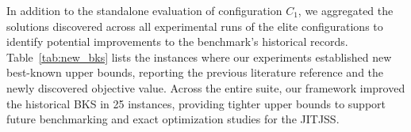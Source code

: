 

In addition to the standalone evaluation of configuration $C_1$, we aggregated the solutions discovered across all experimental runs of the elite configurations to identify potential improvements to the benchmark's historical records.
Table~\ref{tab:new_bks} lists the instances where our experiments established new best-known upper bounds, reporting the previous literature reference and the newly discovered objective value.
Across the entire suite, our framework improved the historical BKS in 25 instances, providing tighter upper bounds to support future benchmarking and exact optimization studies for the JITJSS.



